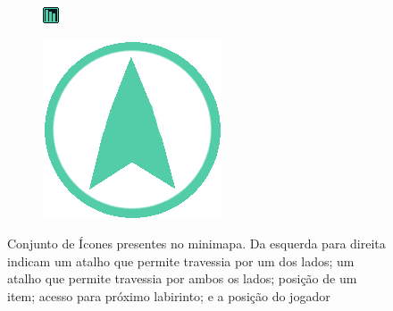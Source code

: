 \documentclass[
	12pt,				%
	openright,			%
	twoside,			%
	a4paper,			%
	english,			%
	french,				%
	spanish,			%
	brazil				%
	]{abntex2}
\begin{document}
\begin{figure}[h!]
\begin{subfigure}[b]{0.1\linewidth}
  \end{subfigure}
  \begin{subfigure}[b]{0.1\linewidth}
    \includegraphics[width=\linewidth]{icon4.jpg}
  \end{subfigure}
  \begin{subfigure}[b]{0.1\linewidth}
    \includegraphics[width=\linewidth]{playericon.png}
  \end{subfigure}
  \caption{Conjunto de Ícones presentes no minimapa. Da esquerda para direita indicam um atalho que permite travessia por um dos lados; um atalho que permite travessia por ambos os lados; posição de um item; acesso para próximo labirinto; e a posição do jogador}
  \label{fig:minimapicons}
\end{figure}
\end{document}
